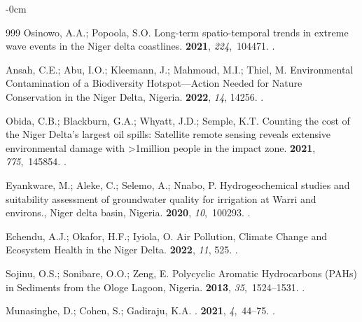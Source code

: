 \documentclass[jmse,article,accept,pdftex,moreauthors]{Definitions/mdpi}
\begin{document}
\begin{adjustwidth}{-\extralength}{0cm}
\begin{thebibliography}{999}
Osinowo, A.A.; Popoola, S.O.
\newblock Long-term spatio-temporal trends in extreme wave events in the Niger
  delta coastlines.
 {\bf 2021}, {\em 224},~104471.
.

Ansah, C.E.; Abu, I.O.; Kleemann, J.; Mahmoud, M.I.; Thiel, M.
\newblock Environmental Contamination of a Biodiversity Hotspot---Action
  Needed for Nature Conservation in the Niger Delta, Nigeria.
 {\bf 2022}, {\em 14}, 14256.
.

Obida, C.B.; Blackburn, G.A.; Whyatt, J.D.; Semple, K.T.
\newblock Counting the cost of the Niger Delta's largest oil spills: Satellite
  remote sensing reveals extensive environmental damage with >1million people
  in the impact zone.
 {\bf 2021}, {\em 775},~145854.
.

Eyankware, M.; Aleke, C.; Selemo, A.; Nnabo, P.
\newblock Hydrogeochemical studies and suitability assessment of groundwater
  quality for irrigation at Warri and environs., Niger delta basin, Nigeria.
 {\bf 2020}, {\em 10},~100293.
.

Echendu, A.J.; Okafor, H.F.; Iyiola, O.
\newblock Air Pollution, Climate Change and Ecosystem Health in the Niger
  Delta.
 {\bf 2022}, {\em 11}, 525.
.

Sojinu, O.S.; Sonibare, O.O.; Zeng, E.
\newblock Polycyclic Aromatic Hydrocarbons (PAHs) in Sediments from the Ologe
  Lagoon, Nigeria.
 {\bf 2013},
  {\em 35},~1524--1531.
.

Munasinghe, D.; Cohen, S.; Gadiraju, K.A.
.
 {\bf 2021}, {\em 4},~44--75.
.


\end{thebibliography}
\end{adjustwidth}
\end{document}
